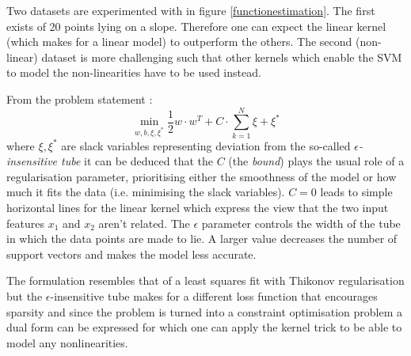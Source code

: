 

Two datasets are experimented with in figure \ref{functionestimation}. The first exists of 20 points lying on a slope. Therefore one can expect the linear kernel (which makes for a linear model) to outperform the others. The second (non-linear) dataset is more challenging such that other kernels which enable the SVM to model the non-linearities have to be used instead. 

\par From the problem statement :
$$\min_{w,b,\xi,\xi^*}\frac{1}{2}w\cdot w^T+C\cdot\sum_{k=1}^N\xi+\xi^*$$
where $\xi,\xi^*$ are slack variables representing deviation from the so-called \textit{$\epsilon$-insensitive tube} it can be deduced that the $C$ (the \textit{bound}) plays the usual role of a regularisation parameter, prioritising either the smoothness of the model or how much it fits the data (i.e. minimising the slack variables). $C=0$ leads to simple horizontal lines for the linear kernel which express the view that the two input features $x_1$ and $x_2$ aren't related. The $\epsilon$ parameter controls the width of the tube in which the data points are made to lie. A larger value decreases the number of support vectors and makes the model less accurate.

\par The formulation resembles that of a least squares fit with Thikonov regularisation but the $\epsilon$-insensitive tube makes for a different loss function that encourages sparsity and since the problem is turned into a constraint optimisation problem a dual form can be expressed for which one can apply the kernel trick to be able to model any nonlinearities.

